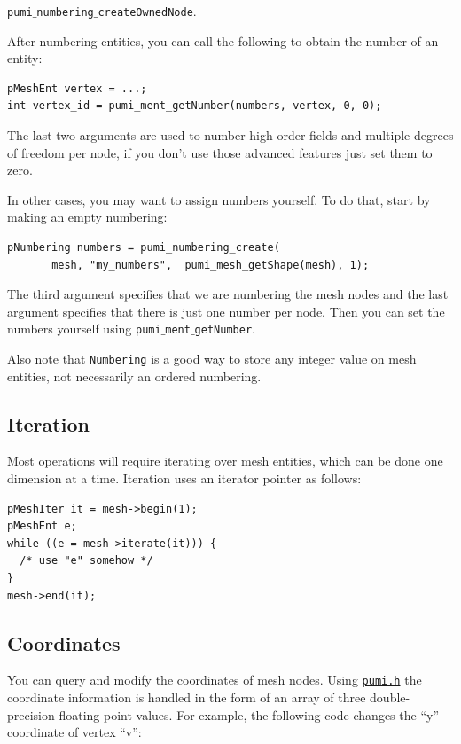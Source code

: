 \documentclass{article}
\begin{document}
{\texttt{pumi$\_$numbering$\_$createOwnedNode}.

After numbering entities, you can call the following to obtain the number of an
entity:

\begin{lstlisting}
pMeshEnt vertex = ...;
int vertex_id = pumi_ment_getNumber(numbers, vertex, 0, 0);
\end{lstlisting}

The last two arguments are used to number high-order fields and
multiple degrees of freedom per node, if you don't use those
advanced features just set them to zero.

In other cases, you may want to assign numbers yourself.
To do that, start by making an empty numbering:

\begin{lstlisting}
pNumbering numbers = pumi_numbering_create(
       mesh, "my_numbers",  pumi_mesh_getShape(mesh), 1);
\end{lstlisting}

The third argument specifies that we are numbering the mesh
nodes and the last argument specifies that there is just one
number per node.
Then you can set the numbers yourself using \texttt{pumi$\_$ment$\_$getNumber}.

Also note that \texttt{Numbering} is a good way to store
any integer value on mesh entities, not necessarily an
ordered numbering.

\subsection{Iteration}

Most operations will require iterating over mesh entities,
which can be done one dimension at a time.
Iteration uses an iterator pointer as follows:

\begin{lstlisting}
pMeshIter it = mesh->begin(1);
pMeshEnt e;
while ((e = mesh->iterate(it))) {
  /* use "e" somehow */
}
mesh->end(it);
\end{lstlisting}

\subsection{Coordinates}

You can query and modify the coordinates of mesh nodes.
Using \href{https://github.com/SCOREC/core/blob/master/pumi/pumi.h}
{\texttt{pumi.h}} the coordinate information is handled in the form of
an array of three double-precision floating point values.
For example, the following code changes the ``y'' coordinate of vertex ``v'':

}
\end{document}
